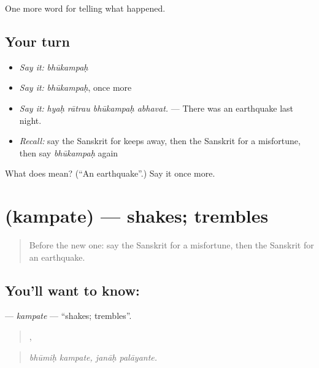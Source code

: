 \begin{grammarlens}[title={What you've built}]
One more word for telling what happened.
\end{grammarlens}

\subsection*{Your turn}
\begin{itemize}
\raggedright
  \item \emph{Say it:} \emph{bhūkampaḥ}
  \item \emph{Say it:} \emph{bhūkampaḥ}, once more
  \item \emph{Say it:} \emph{hyaḥ rātrau bhūkampaḥ abhavat.} — There was an earthquake last night.
  \item \emph{Recall:} say the Sanskrit for keeps away, then the Sanskrit for a misfortune, then say \emph{bhūkampaḥ} again
\end{itemize}

\begin{tcolorbox}[breakable,colback=teal!4,colframe=teal!35!black,title={Before you move on}]
What does  mean? (\textquotedblleft{}An earthquake\textquotedblright{}.) Say it once more.
\end{tcolorbox}
\section[\texorpdfstring{\sk{कम्पते} (kampate)}{कम्पते (kampate)}]{ (kampate) — shakes; trembles}

\label{lesson:SA-C300-kampate}



\begin{quote}
Before the new one: say the Sanskrit for a misfortune, then the Sanskrit for an earthquake.
\end{quote}

\subsection*{You'll want to know: }
\textbf{} — \emph{kampate} — \textquotedblleft{}shakes; trembles\textquotedblright{}.

\begin{quote}
 ,  
\end{quote}

\begin{quote}
\emph{bhūmiḥ kampate, janāḥ palāyante.}
\end{quote}

